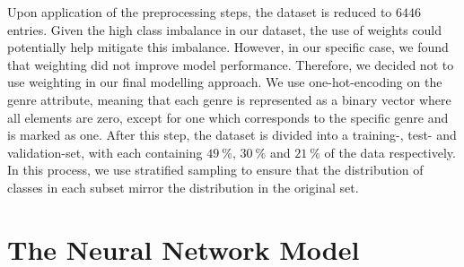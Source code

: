 \documentclass[
  12pt,
  bibliography=totoc,     %
  captions=tableheading,  %
  titlepage=firstiscover, %
]{scrartcl}
\begin{document}
\FloatBarrier
\noindent
Upon application of the preprocessing steps, the dataset is reduced to $6446$ entries.
Given the high class imbalance in our dataset, the use of weights could potentially help mitigate this imbalance. However, in our specific case, we found that weighting did not improve model performance. Therefore, we decided not to use weighting in our final modelling approach. We use one-hot-encoding on the genre attribute, meaning that each genre is represented as a binary vector where all elements are zero, except for one which corresponds to the specific genre and is marked as one.
After this step, the dataset is divided into a training-, test- and validation-set, with each containing $\SI{49}{\percent}$, $\SI{30}{\percent}$ and $\SI{21}{\percent}$
of the data respectively. In this process, we use stratified sampling to ensure that the distribution of classes in each subset mirror the distribution in the original
set.
\section{The Neural Network Model}
\end{document}
